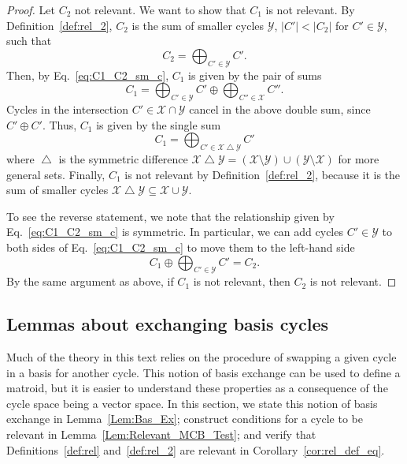 \documentclass[fleqn,11pt]{article}
\newcommand\calX{\mathcal{X}}     %
\newcommand\calY{\mathcal{Y}}
\newcommand\CycSp{\mathcal{C}}    %
\newcommand\symdiff{\mathop{\triangle}}
\begin{document}
\begin{proof}
	Let $C_2$ not relevant. We want to show that $C_1$ is not relevant. By Definition~\ref{def:rel_2}, $C_2$ is the sum of smaller cycles $\calY$, $|C'|<|C_2|$ for $C'\in\calY$, such that
	\begin{equation}
		C_2 = \bigoplus_{C'\in\calY}C'.
	\end{equation}
	Then, by Eq.~\eqref{eq:C1_C2_sm_c}, $C_1$ is given by the pair of sums
	\begin{equation}
		C_1 = \bigoplus_{C'\in\calY} C' \oplus \bigoplus_{C''\in\calX}C''.
	\end{equation}
	Cycles in the intersection $C'\in\calX\cap\calY$ cancel in the above double sum, since $C'\oplus C'$. Thus, $C_1$ is given by the single sum
	\begin{equation}
		C_1 = \bigoplus_{C'\in\calX\symdiff\calY} C'
	\end{equation}
	where $\symdiff$ is the symmetric difference $\calX\symdiff\calY = (\calX\setminus\calY)\cup(\calY\setminus\calX)$ for more general sets. Finally, $C_1$ is not relevant by Definition~\ref{def:rel_2}, because it is the sum of smaller cycles $\calX\symdiff\calY\subseteq\calX\cup\calY$. 
	
	To see the reverse statement, we note that the relationship given by Eq.~\eqref{eq:C1_C2_sm_c} is symmetric. In particular, we can add cycles $C'\in\calY$ to both sides of Eq.~\eqref{eq:C1_C2_sm_c} to move them to the left-hand side
	\begin{equation}
		C_1 \oplus \bigoplus_{C'\in\calY} C' = C_2.
	\end{equation}
	By the same argument as above, if $C_1$ is not relevant, then $C_2$ is not relevant.
\end{proof}







\subsection{Lemmas about exchanging basis cycles}
\label{sub:basis_ex}

	Much of the theory in this text relies on the procedure of swapping a given cycle in a basis for another cycle. This notion of basis exchange can be used to define a matroid, but it is easier to understand these properties as a consequence of the cycle space being a vector space. In this section, we state this notion of basis exchange in Lemma~\ref{Lem:Bas_Ex}; construct conditions for a cycle to be relevant in Lemma~\ref{Lem:Relevant_MCB_Test}; and verify that Definitions~\ref{def:rel} and~\ref{def:rel_2} are relevant in Corollary~\ref{cor:rel_def_eq}.
\end{document}

